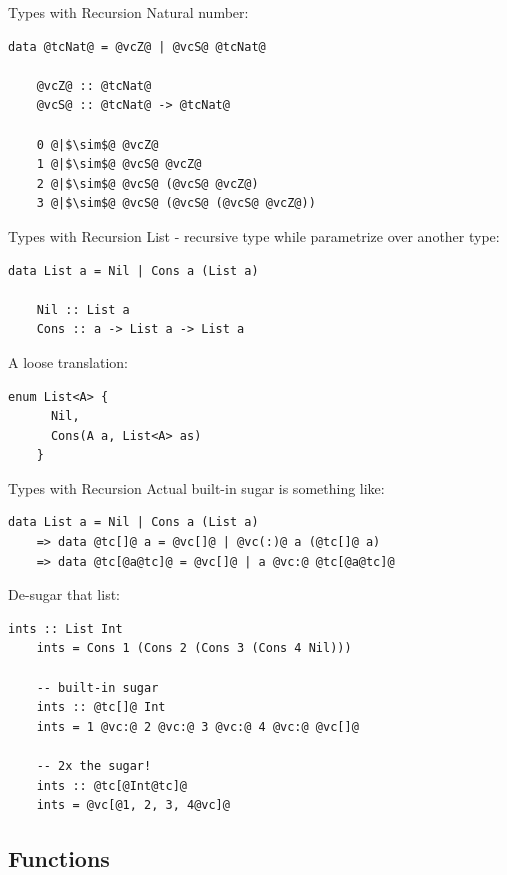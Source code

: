 \documentclass[xcolor={usenames,dvipsnames}]{beamer}
\begin{document}
\begin{frame}[fragile]{Types with Recursion}
  Natural number:
  \begin{lstlisting}[style=hask]
    data @tcNat@ = @vcZ@ | @vcS@ @tcNat@

    @vcZ@ :: @tcNat@
    @vcS@ :: @tcNat@ -> @tcNat@

    0 @|$\sim$@ @vcZ@
    1 @|$\sim$@ @vcS@ @vcZ@
    2 @|$\sim$@ @vcS@ (@vcS@ @vcZ@)
    3 @|$\sim$@ @vcS@ (@vcS@ (@vcS@ @vcZ@))
  \end{lstlisting}
\end{frame}

\begin{frame}[fragile]{Types with Recursion}
  List - recursive type while parametrize over another type:
  \begin{lstlisting}[style=hask]
    data List a = Nil | Cons a (List a)

    Nil :: List a
    Cons :: a -> List a -> List a
  \end{lstlisting}

  \pause
  A loose translation:
  \begin{lstlisting}[style=hask]
    enum List<A> {
      Nil,
      Cons(A a, List<A> as)
    }
  \end{lstlisting}
\end{frame}

\begin{frame}[fragile]{Types with Recursion}
  Actual built-in sugar is something like:
  \begin{lstlisting}[style=hask]
       data List a = Nil | Cons a (List a)
    => data @tc[]@ a = @vc[]@ | @vc(:)@ a (@tc[]@ a)
    => data @tc[@a@tc]@ = @vc[]@ | a @vc:@ @tc[@a@tc]@
  \end{lstlisting}

  \pause
  De-sugar that list:
  \begin{lstlisting}[style=hask]
    ints :: List Int 
    ints = Cons 1 (Cons 2 (Cons 3 (Cons 4 Nil)))

    -- built-in sugar
    ints :: @tc[]@ Int
    ints = 1 @vc:@ 2 @vc:@ 3 @vc:@ 4 @vc:@ @vc[]@

    -- 2x the sugar!
    ints :: @tc[@Int@tc]@
    ints = @vc[@1, 2, 3, 4@vc]@
  \end{lstlisting}
\end{frame}


\subsection{Functions}
\end{document}
